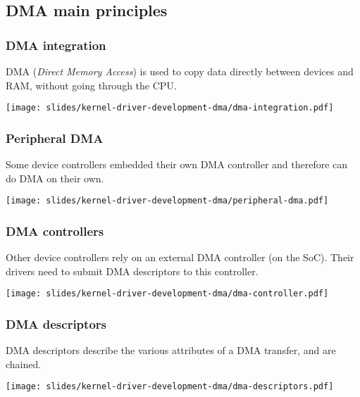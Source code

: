 \subsection{DMA main principles}

\begin{frame}
  \frametitle{DMA integration}
  DMA ({\em Direct Memory Access}) is used to copy data directly between
  devices and RAM, without going through the CPU.
  \begin{center}
    \texttt{[image: slides/kernel-driver-development-dma/dma-integration.pdf]}
  \end{center}
\end{frame}

\begin{frame}
  \frametitle{Peripheral DMA}
  Some device controllers embedded their own DMA controller
  and therefore can do DMA on their own.
  \begin{center}
    \texttt{[image: slides/kernel-driver-development-dma/peripheral-dma.pdf]}
  \end{center}
\end{frame}

\begin{frame}
  \frametitle{DMA controllers}
  Other device controllers rely on an external DMA controller (on the
  SoC). Their drivers need to submit DMA descriptors to this controller.
  \begin{center}
    \texttt{[image: slides/kernel-driver-development-dma/dma-controller.pdf]}
  \end{center}
\end{frame}

\begin{frame}
  \frametitle{DMA descriptors}
  DMA descriptors describe the various attributes of a DMA transfer, and are chained.
  \begin{center}
    \texttt{[image: slides/kernel-driver-development-dma/dma-descriptors.pdf]}
  \end{center}
\end{frame}

